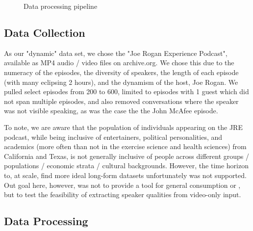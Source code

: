 \documentclass[10pt,twocolumn,letterpaper]{article}
\begin{document}
\begin{figure}[t]
   \caption{Data processing pipeline}
   \label{fig:onecol}
\end{figure}

\subsection{Data Collection}

As our "dynamic" data set, we chose the "Joe Rogan Experience Podcast", available as MP4 audio / video files on archive.org. We chose this due to the numeracy of the episodes, the diversity of speakers, the length of each episode (with many eclipsing 2 hours), and the dynamism of the host, Joe Rogan. We pulled select episodes from 200 to 600, limited to episodes with 1 guest which did not span multiple episodes, and also removed conversations where the speaker was not visible speaking, as was the case the the John McAfee episode. 

To note, we are aware that the population of individuals appearing on the JRE podcast, while being inclusive of entertainers, political personalities, and academics (more often than not in the exercise science and health sciences)  from California and Texas, is not generally inclusive of people across different groups / populations / economic strata / cultural backgrounds. However, the time horizon to, at scale, find more ideal long-form datasets unfortunately was not supported. Out goal here, however, was not to provide a tool for general consumption or , but to test the feasibility of extracting speaker qualities from video-only input.

\subsection{Data Processing}
\end{document}
